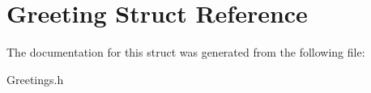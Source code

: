\hypertarget{struct_greeting}{}\section{Greeting Struct Reference}
\label{struct_greeting}


The documentation for this struct was generated from the following file\+:\begin{DoxyCompactItemize}
\item 
Greetings.\+h\end{DoxyCompactItemize}
